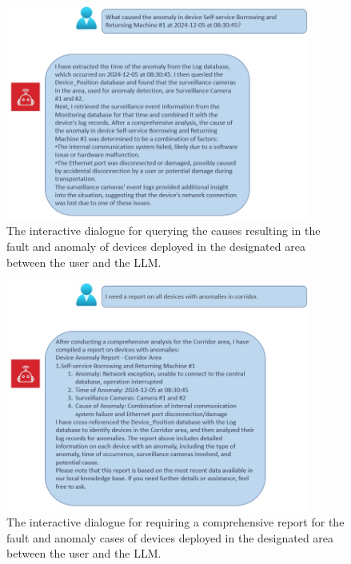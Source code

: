 \documentclass[preprint,12pt]{elsarticle}
\begin{document}
\begin{figure}[!h]
	\centering
	\includegraphics[width=10cm]{case3.png}
	\caption{The interactive dialogue for querying the causes resulting in the fault and anomaly of devices deployed in the designated area between the user and the LLM.}
	\label{case3}
\end{figure}

\begin{figure}[!h]
	\centering
	\includegraphics[width=10cm]{case4.png}
	\caption{The interactive dialogue for requiring a comprehensive report for the fault and anomaly cases of devices deployed in the designated area between the user and the LLM.}
	\label{case4}
\end{figure}
\end{document}
